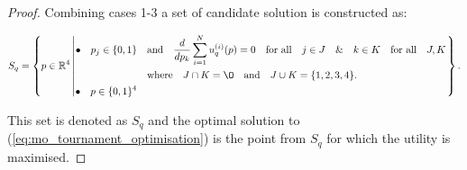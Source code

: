 \begin{proof}
Combining cases 1-3 a set of candidate solution is constructed as:

\begin{equation*}
    S_q =
    \left\{p \in \mathbb{R} ^ 4 \left|
        \begin{aligned}
            \bullet\quad p_j \in \{0, 1\} & \quad \text{and} \quad \frac{d}{dp_k} 
            \sum\limits_{i=1} ^ N  u_q^{(i)}(p) = 0
            \quad \text{for all} \quad j \in J \quad \&  \quad k \in K  \quad \text{for all} \quad J, K \\
            & \quad \text{where} \quad J \cap K = \O \quad
            \text{and} \quad J \cup K = \{1, 2, 3, 4\}.\\
            \bullet\quad  p \in \{0, 1\} ^ 4
        \end{aligned}\right.
    \right\}.
\end{equation*}

This set is denoted as $S_q$ and the optimal solution to
(\ref{eq:mo_tournament_optimisation}) is the point from $S_q$ for which the
utility is maximised.






\end{proof}
